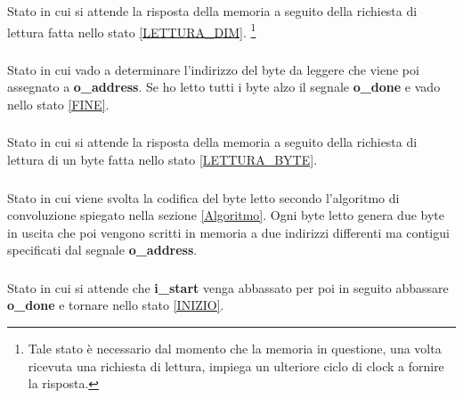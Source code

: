\documentclass[a4paper]{article}
\begin{document}
\subsubsection{}
Stato in cui si attende la risposta della memoria a seguito della richiesta di lettura fatta nello stato \ref{LETTURA_DIM}. \footnote{Tale stato è necessario dal momento che la memoria in questione, una volta ricevuta una richiesta di lettura, impiega un ulteriore ciclo di clock a fornire la risposta.}
\label{ATTESA_LETTURA_DIM}
\subsubsection{}
Stato in cui vado a determinare l'indirizzo del byte da leggere che viene poi assegnato a \textbf{o\_address}. Se ho letto tutti i byte alzo il segnale \textbf{o\_done} e vado nello stato \ref{FINE}.
\label{LETTURA_BYTE}
\subsubsection{}
Stato in cui si attende la risposta della memoria a seguito della richiesta di lettura di un byte fatta nello stato \ref{LETTURA_BYTE}. \footnotemark[\value{footnote}]
\label{ATTESA_LETTURA_BYTE}
\subsubsection{}
Stato in cui viene svolta la codifica del byte letto secondo l'algoritmo di convoluzione spiegato nella sezione \ref{Algoritmo}. Ogni byte letto genera due byte in uscita che poi vengono scritti in memoria a due indirizzi differenti ma contigui specificati dal segnale \textbf{o\_address}.
\subsubsection{}
Stato in cui si attende che \textbf{i\_start} venga abbassato per poi in seguito abbassare \textbf{o\_done} e tornare nello stato \ref{INIZIO}.
\label{FINE}
\clearpage
\end{document}

